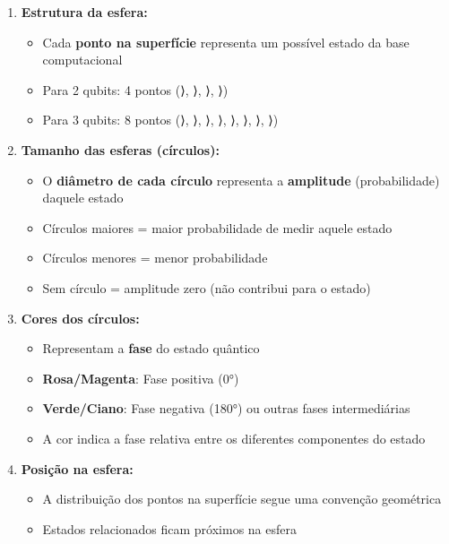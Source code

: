 \documentclass[
  brazilian,
]{report}
\providecommand{\tightlist}{%
  \setlength{\itemsep}{0pt}\setlength{\parskip}{0pt}}
\begin{document}
\begin{enumerate}
\def\labelenumi{\arabic{enumi}.}
\tightlist
\item
  \textbf{Estrutura da esfera:}

  \begin{itemize}
  \tightlist
  \item
    Cada \textbf{ponto na superfície} representa um possível estado da
    base computacional
  \item
    Para 2 qubits: 4 pontos (⟩, ⟩, ⟩,
    ⟩)
  \item
    Para 3 qubits: 8 pontos (⟩, ⟩, ⟩,
    ⟩, ⟩, ⟩, ⟩,
    ⟩)
  \end{itemize}
\item
  \textbf{Tamanho das esferas (círculos):}

  \begin{itemize}
  \tightlist
  \item
    O \textbf{diâmetro de cada círculo} representa a \textbf{amplitude}
    (probabilidade) daquele estado
  \item
    Círculos maiores = maior probabilidade de medir aquele estado
  \item
    Círculos menores = menor probabilidade
  \item
    Sem círculo = amplitude zero (não contribui para o estado)
  \end{itemize}
\item
  \textbf{Cores dos círculos:}

  \begin{itemize}
  \tightlist
  \item
    Representam a \textbf{fase} do estado quântico
  \item
    \textbf{Rosa/Magenta}: Fase positiva (0°)
  \item
    \textbf{Verde/Ciano}: Fase negativa (180°) ou outras fases
    intermediárias
  \item
    A cor indica a fase relativa entre os diferentes componentes do
    estado
  \end{itemize}
\item
  \textbf{Posição na esfera:}

  \begin{itemize}
  \tightlist
  \item
    A distribuição dos pontos na superfície segue uma convenção
    geométrica
  \item
    Estados relacionados ficam próximos na esfera
  \end{itemize}
\end{enumerate}
\end{document}
